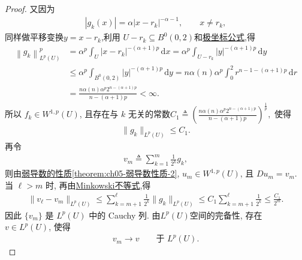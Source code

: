 \documentclass[../../main.tex]{subfiles}
\begin{document}
\begin{proof}
又因为
\begin{align*}
|g_k(x)|=\alpha|x-r_k|^{-\alpha-1},
\qquad x\neq r_k,
\end{align*}
同样做平移变换$y=x-r_k$,利用 $U-r_k\subseteq B^{0}(0,2)$和\hyperref[theorem:appC-极坐标]{极坐标公式},得
\begin{align*}
\left\| g_k \right\| _{L^p\left( U \right)}^{p}&=\alpha ^p\int_U{\left| x-r_k \right|^{-(\alpha +1)p}\,\mathrm{d}x}=\alpha ^p\int_{U-r_k}{\left| y \right|^{-(\alpha +1)p}\,\mathrm{d}y}
\\
&\leqslant \alpha ^p\int_{B^0(0,2)}{\left| y \right|^{-(\alpha +1)p}\,\mathrm{d}y}=n\alpha (n)\alpha ^p\int_0^2{r^{n-1-(\alpha +1)p}\,\mathrm{d}r}
\\
&=\frac{n\alpha (n)\alpha ^p2^{n-(\alpha +1)p}}{n-(\alpha +1)p}<\infty .
\end{align*}
所以 $f_k\in W^{1,p}(U)$, 且存在与 $k$ 无关的常数$C_1\triangleq
\left(
\frac{n\alpha(n)\alpha^p2^{n-(\alpha+1)p}}
{n-(\alpha+1)p}
\right)^{\frac{1}{p}},$
使得
\begin{align*}
\|g_k\|_{L^p(U)}\leqslant C_1.
\end{align*}
再令
\begin{align*}
v_m\triangleq
\sum\limits_{k=1}^{m}\frac{1}{2^k}g_k,
\end{align*}
则由\hyperref[theorem:ch05-弱导数性质]{弱导数的性质\ref{theorem:ch05-弱导数性质-2}}, $u_m\in W^{1,p}(U)$, 且 $Du_m=v_m$.
当 $\ell>m$ 时, 再由\hyperref[Real Analysis-theorem:实变函数--Minkowski不等式]{Minkowski不等式},得
\begin{align*}
\|v_\ell-v_m\|_{L^p(U)}
\leqslant
\sum\limits_{k=m+1}^{\ell}
\frac{1}{2^k}\|g_k\|_{L^p(U)}
\leqslant C_1\sum\limits_{k=m+1}^{\ell}\frac{1}{2^k}
\leqslant\frac{C_1}{2^m}.
\end{align*}
因此 $\{v_m\}$ 是 $L^p(U)$ 中的 Cauchy 列. 由$L^p(U)$空间的完备性, 存在 $v\in L^p(U)$, 使得
\begin{align*}
v_m\longrightarrow v
\qquad\text{于 }L^p(U).
\end{align*}


\end{proof}
\end{document}
